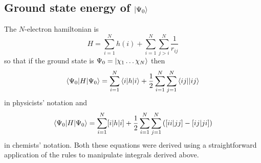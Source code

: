 \begin{enumerate}
\subsection{Ground state energy of $\ket{\Psi_0}$}
The $N$-electron hamiltonian is
\[
H = \sum_{i=1}^N h(i) + \sum_{i=1}^N\sum_{j > i}^N \frac{1}{r_{ij}}
\]
so that if the ground state is ${\Psi_0} = \ket{\chi_1\ldots\chi_N}$ then
\begin{equation}\label{c2e101}
\braket{\Psi_0|H|\Psi_0} = \sum_{i=1}^N\braket{i|h|i} + \frac{1}{2}\sum_{i=1}^N
\sum_{j=1}^N\braket{ij||ij}
\end{equation}
in physicists' notation and
\begin{equation}\label{c2e102}
\braket{\Psi_0|H|\Psi_0} = \sum_{i=1}^N[i|h|i] + \frac{1}{2}\sum_{i=1}^N
\sum_{j=1}^N\left([ii|jj] - [ij|ji]\right)
\end{equation}
in chemists' notation. Both these equations were derived using a straightforward 
application of the rules to manipulate integrals derived above.
\end{enumerate}

